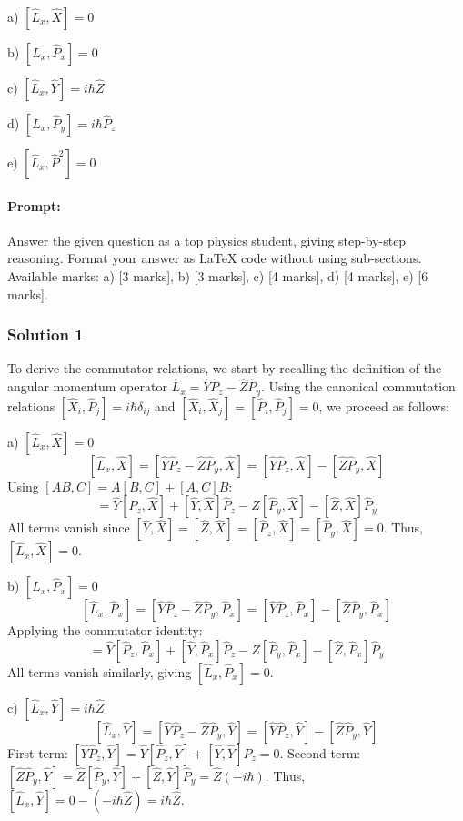\documentclass{article}
\begin{document}
a) $\left[\hat{L}_x, \hat{X}\right] = 0$  

b) $\left[\hat{L}_x, \hat{P}_x\right] = 0$  

c) $\left[\hat{L}_x, \hat{Y}\right] = i\hbar \hat{Z}$  

d) $\left[\hat{L}_x, \hat{P}_y\right] = i\hbar \hat{P}_z$  

e) $\left[\hat{L}_x, \hat{P}^2\right] = 0$

\paragraph{Prompt: \\} 
Answer the given question as a top physics student, giving step-by-step reasoning. Format your answer as LaTeX code without using sub-sections. Available marks: a) [3 marks], b) [3 marks], c) [4 marks], d) [4 marks], e) [6 marks].

\subsubsection{Solution 1}
To derive the commutator relations, we start by recalling the definition of the angular momentum operator $\hat{L}_x = \hat{Y}\hat{P}_z - \hat{Z}\hat{P}_y$. Using the canonical commutation relations $[\hat{X}_i, \hat{P}_j] = i\hbar \delta_{ij}$ and $[\hat{X}_i, \hat{X}_j] = [\hat{P}_i, \hat{P}_j] = 0$, we proceed as follows:

a) $[\hat{L}_x, \hat{X}] = 0$
\[
[\hat{L}_x, \hat{X}] = [\hat{Y}\hat{P}_z - \hat{Z}\hat{P}_y, \hat{X}] = [\hat{Y}\hat{P}_z, \hat{X}] - [\hat{Z}\hat{P}_y, \hat{X}]
\]
Using $[AB, C] = A[B,C] + [A,C]B$:
\[
= \hat{Y}[\hat{P}_z, \hat{X}] + [\hat{Y}, \hat{X}]\hat{P}_z - \hat{Z}[\hat{P}_y, \hat{X}] - [\hat{Z}, \hat{X}]\hat{P}_y
\]
All terms vanish since $[\hat{Y}, \hat{X}] = [\hat{Z}, \hat{X}] = [\hat{P}_z, \hat{X}] = [\hat{P}_y, \hat{X}] = 0$. Thus, $[\hat{L}_x, \hat{X}] = 0$.

b) $[\hat{L}_x, \hat{P}_x] = 0$
\[
[\hat{L}_x, \hat{P}_x] = [\hat{Y}\hat{P}_z - \hat{Z}\hat{P}_y, \hat{P}_x] = [\hat{Y}\hat{P}_z, \hat{P}_x] - [\hat{Z}\hat{P}_y, \hat{P}_x]
\]
Applying the commutator identity:
\[
= \hat{Y}[\hat{P}_z, \hat{P}_x] + [\hat{Y}, \hat{P}_x]\hat{P}_z - \hat{Z}[\hat{P}_y, \hat{P}_x] - [\hat{Z}, \hat{P}_x]\hat{P}_y
\]
All terms vanish similarly, giving $[\hat{L}_x, \hat{P}_x] = 0$.

c) $[\hat{L}_x, \hat{Y}] = i\hbar \hat{Z}$
\[
[\hat{L}_x, \hat{Y}] = [\hat{Y}\hat{P}_z - \hat{Z}\hat{P}_y, \hat{Y}] = [\hat{Y}\hat{P}_z, \hat{Y}] - [\hat{Z}\hat{P}_y, \hat{Y}]
\]
First term: $[\hat{Y}\hat{P}_z, \hat{Y}] = \hat{Y}[\hat{P}_z, \hat{Y}] + [\hat{Y}, \hat{Y}]\hat{P}_z = 0$.  
Second term: $[\hat{Z}\hat{P}_y, \hat{Y}] = \hat{Z}[\hat{P}_y, \hat{Y}] + [\hat{Z}, \hat{Y}]\hat{P}_y = \hat{Z}(-i\hbar)$.  
Thus, $[\hat{L}_x, \hat{Y}] = 0 - (-i\hbar \hat{Z}) = i\hbar \hat{Z}$.
\end{document}
